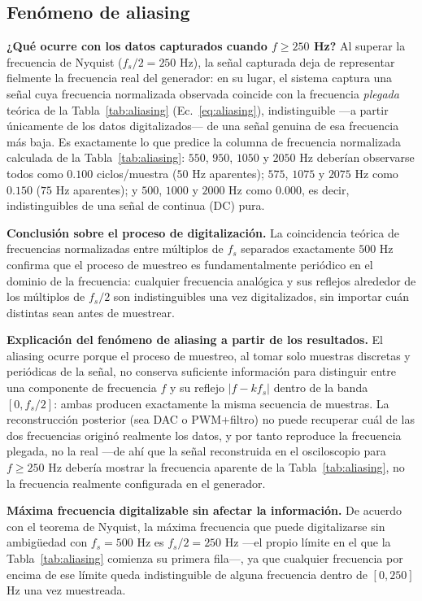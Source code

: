 \subsection{Fenómeno de aliasing}
\label{sec:discusion-aliasing}

\textbf{¿Qué ocurre con los datos capturados cuando $f \geq 250$ Hz?} Al superar la frecuencia de Nyquist ($f_s/2 = 250$ Hz), la señal capturada deja de representar fielmente la frecuencia real del generador: en su lugar, el sistema captura una señal cuya frecuencia normalizada observada coincide con la frecuencia \emph{plegada} teórica de la Tabla~\ref{tab:aliasing} (Ec.~\ref{eq:aliasing}), indistinguible —a partir únicamente de los datos digitalizados— de una señal genuina de esa frecuencia más baja. Es exactamente lo que predice la columna de frecuencia normalizada calculada de la Tabla~\ref{tab:aliasing}: $550$, $950$, $1050$ y $2050$ Hz deberían observarse todos como $0.100$ ciclos/muestra ($50$ Hz aparentes); $575$, $1075$ y $2075$ Hz como $0.150$ ($75$ Hz aparentes); y $500$, $1000$ y $2000$ Hz como $0.000$, es decir, indistinguibles de una señal de continua (DC) pura.

\textbf{Conclusión sobre el proceso de digitalización.} La coincidencia teórica de frecuencias normalizadas entre múltiplos de $f_s$ separados exactamente $500$ Hz confirma que el proceso de muestreo es fundamentalmente periódico en el dominio de la frecuencia: cualquier frecuencia analógica y sus reflejos alrededor de los múltiplos de $f_s/2$ son indistinguibles una vez digitalizados, sin importar cuán distintas sean antes de muestrear.

\textbf{Explicación del fenómeno de aliasing a partir de los resultados.} El aliasing ocurre porque el proceso de muestreo, al tomar solo muestras discretas y periódicas de la señal, no conserva suficiente información para distinguir entre una componente de frecuencia $f$ y su reflejo $|f - kf_s|$ dentro de la banda $[0, f_s/2]$: ambas producen exactamente la misma secuencia de muestras. La reconstrucción posterior (sea DAC o PWM+filtro) no puede recuperar cuál de las dos frecuencias originó realmente los datos, y por tanto reproduce la frecuencia plegada, no la real —de ahí que la señal reconstruida en el osciloscopio para $f \geq 250$ Hz debería mostrar la frecuencia aparente de la Tabla~\ref{tab:aliasing}, no la frecuencia realmente configurada en el generador.

\textbf{Máxima frecuencia digitalizable sin afectar la información.} De acuerdo con el teorema de Nyquist, la máxima frecuencia que puede digitalizarse sin ambigüedad con $f_s = 500$ Hz es $f_s/2 = 250$ Hz —el propio límite en el que la Tabla~\ref{tab:aliasing} comienza su primera fila—, ya que cualquier frecuencia por encima de ese límite queda indistinguible de alguna frecuencia dentro de $[0, 250]$ Hz una vez muestreada.
